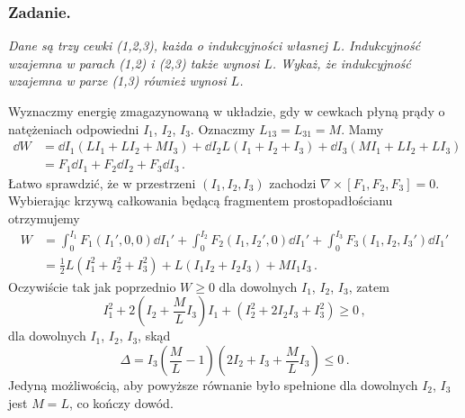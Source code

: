 \documentclass[../main.tex]{subfiles}
\begin{document}
\subsubsection*{Zadanie.} \textit{Dane są trzy cewki (1,2,3), każda o indukcyjności własnej \(L\).
Indukcyjność wzajemna w parach (1,2) i (2,3) także wynosi \(L\). Wykaż, że indukcyjność wzajemna w
parze (1,3) również wynosi \(L\).}
\medskip

Wyznaczmy energię zmagazynowaną w układzie, gdy w cewkach płyną prądy o natężeniach odpowiedni
\(I_1\), \(I_2\), \(I_3\). Oznaczmy \(L_{13}=L_{31}=M\). Mamy
\begin{equation*}
\begin{split}
    \dd{W}&=\dd{I_1}(LI_1+LI_2+MI_3)+\dd{I_2}L(I_1+I_2+I_3)+\dd{I_3}(MI_1+LI_2+LI_3)\\
    &=F_1\dd{I_1}+F_2\dd{I_2}+F_3\dd{I_3}\,.
\end{split}
\end{equation*}
Łatwo sprawdzić, że w przestrzeni \((I_1,I_2,I_3)\) zachodzi \(\nabla\times[F_1,F_2,F_3]=0\).
Wybierając krzywą całkowania będącą fragmentem prostopadłościanu otrzymujemy
\begin{equation*}
\begin{split}
    W&=\int_0^{I_1}F_1(I_1',0,0)\dd{I_1'}+\int_0^{I_2}F_2(I_1,I_2',0)\dd{I_1'}+\int_0^{I_3}F_3(I_1,I_2,I_3')\dd{I_1'}\\
    &=\frac{1}{2}L(I_1^2+I_2^2+I_3^2)+L(I_1I_2+I_2I_3)+MI_1I_3\,.
\end{split}
\end{equation*}
Oczywiście tak jak poprzednio \(W\geq0\) dla dowolnych \(I_1\), \(I_2\), \(I_3\), zatem
\begin{equation*}
    I_1^2+2\left(I_2+\frac{M}{L}I_3\right)I_1+(I_2^2+2I_2I_3+I_3^2)\geq0\,,
\end{equation*}
dla dowolnych \(I_1\), \(I_2\), \(I_3\), skąd
\begin{equation*}
    \Delta = I_3\left(\frac{M}{L}-1\right)\left(2I_2+I_3+\frac{M}{L}I_3\right)\leq0\,.
\end{equation*}
Jedyną możliwością, aby powyższe równanie było spełnione dla dowolnych \(I_2\), \(I_3\) jest
\(M=L\), co kończy dowód.
\end{document}
